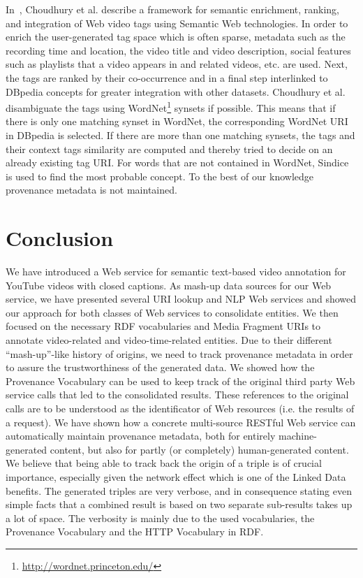 \documentclass[conference]{IEEEtran}
\begin{document}
In~\cite{Choudhury:YouTube}, Choudhury et al. describe a framework for semantic enrichment, ranking, and integration of
Web video tags using Semantic Web technologies. In order to enrich the user-generated tag space which is often sparse,
metadata such as the recording time and location, the video title and video description, social features such as
playlists that a video appears in and related videos, etc. are used. Next, the tags are ranked by their co-occurrence
and in a final step interlinked to DBpedia concepts for greater integration with other datasets. Choudhury et al.
disambiguate the tags using WordNet\footnote{\url{http://wordnet.princeton.edu/}} synsets if possible. This means that
if there is only one matching synset in WordNet, the corresponding WordNet URI in DBpedia is selected. If there are
more than one matching synsets, the tags and their context tags similarity are computed and thereby tried to decide on
an already existing tag URI. For words that are not contained in WordNet, Sindice is used to find the most probable
concept. To the best of our knowledge provenance metadata is not maintained.


\section{Conclusion}                                                        \label{sec:conclusion}
We have introduced a Web service for semantic text-based video annotation for YouTube videos with closed captions. As mash-up data sources for our Web service, we have
presented several URI lookup and NLP Web services and showed our approach for both classes of Web services to
consolidate entities. We then focused on the necessary RDF vocabularies and Media Fragment URIs to annotate
video-related and video-time-related entities. Due to their different ``mash-up''-like history of origins, we need to
track provenance metadata in order to assure the trustworthiness of the generated data. We showed how the Provenance
Vocabulary can be used to keep track of the original third party Web service calls that led to the consolidated
results. These references to the original calls are to be understood as the identificator of Web resources (i.e. the
results of a request). We have shown how a concrete multi-source RESTful Web service can automatically maintain provenance
metadata, both for entirely machine-generated content, but also for partly (or completely) human-generated content. We
believe that being able to track back the origin of a triple is of crucial importance, especially given the network
effect which is one of the Linked Data benefits. The generated triples are very verbose, and in consequence stating even simple facts that a combined result is based on two separate sub-results takes up a lot of space. The verbosity is mainly due to the used vocabularies, the Provenance Vocabulary and the HTTP Vocabulary in RDF.
\end{document}
